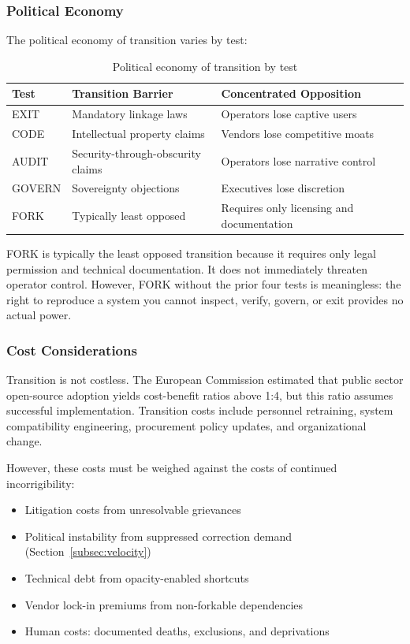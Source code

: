 \subsubsection{Political Economy}

The political economy of transition varies by test:

\begin{table}[h]
\centering
\caption{Political economy of transition by test}
\label{tab:political-economy}
\begin{tabular}{lll}
\hline
\textbf{Test} & \textbf{Transition Barrier} & \textbf{Concentrated Opposition} \\
\hline
EXIT & Mandatory linkage laws & Operators lose captive users \\
CODE & Intellectual property claims & Vendors lose competitive moats \\
AUDIT & Security-through-obscurity claims & Operators lose narrative control \\
GOVERN & Sovereignty objections & Executives lose discretion \\
FORK & Typically least opposed & Requires only licensing and documentation \\
\hline
\end{tabular}
\end{table}

FORK is typically the least opposed transition because it requires only legal permission and technical documentation. It does not immediately threaten operator control. However, FORK without the prior four tests is meaningless: the right to reproduce a system you cannot inspect, verify, govern, or exit provides no actual power.

\subsubsection{Cost Considerations}

Transition is not costless. The European Commission \citep{eu2021oss} estimated that public sector open-source adoption yields cost-benefit ratios above 1:4, but this ratio assumes successful implementation. Transition costs include personnel retraining, system compatibility engineering, procurement policy updates, and organizational change.

However, these costs must be weighed against the costs of continued incorrigibility:

\begin{itemize}
    \item Litigation costs from unresolvable grievances
    \item Political instability from suppressed correction demand (Section~\ref{subsec:velocity})
    \item Technical debt from opacity-enabled shortcuts
    \item Vendor lock-in premiums from non-forkable dependencies
    \item Human costs: documented deaths, exclusions, and deprivations
\end{itemize}

